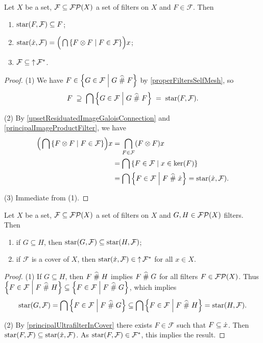 \begin{lemma} \label{starRefinementLemma}
Let $X$ be a set, $\mathcal{F} \subseteq \operatorname{\mathcal{FP}}(X)$ a set of filters on $X$ and $F\in \mathcal{F}$. Then
\begin{enumerate}
\item $\operatorname{star}(F,\mathcal{F}) \subseteq F$;
\item $\starFilter(\pfilter{x}, \mathcal{F}) = \Big(\bigcap\setbuilder{F\otimes F}{F\in\mathcal{F}}\Big)x$;
\item $\mathcal{F} \subseteq \operatorname{\uparrow}\mathcal{F}^*$.
\end{enumerate}
\end{lemma}
\begin{proof}
(1) We have $F\in \setbuilder{G\in \mathcal{F}}{G \amesh F}$ by \ref{properFiltersSelfMesh}, so
\[ F \;\supseteq\; \bigcap \setbuilder{G\in \mathcal{F}}{G \amesh F} \;=\; \starFilter(F,\mathcal{F}). \]

(2) By \ref{upsetResiduatedImageGaloisConnection} and \ref{principalImageProductFilter}, we have
\begin{align*}
\Big(\bigcap\setbuilder{F\otimes F}{F\in\mathcal{F}}\Big)x &= \bigcap_{F\in\mathcal{F}}(F\otimes F)x \\
&= \bigcap \setbuilder{F\in\mathcal{F}}{x\in\ker(F)} \\
&= \bigcap \setbuilder{F\in\mathcal{F}}{F\amesh\pfilter{x}} = \starFilter(\pfilter{x}, \mathcal{F}).
\end{align*}

(3) Immediate from (1).
\end{proof}

\begin{lemma} \label{starFilterOrderingLemma}
Let $X$ be a set, $\mathcal{F} \subseteq \operatorname{\mathcal{FP}}(X)$ a set of filters on $X$ and $G,H\in \operatorname{\mathcal{FP}}(X)$ filters. Then
\begin{enumerate}
\item if $G\subseteq H$, then $\operatorname{star}(G,\mathcal{F}) \subseteq \operatorname{star}(H,\mathcal{F})$;
\item if $\mathcal{F}$ is a cover of $X$, then $\operatorname{star}(\dot{x}, \mathcal{F}) \in \operatorname{\uparrow} \mathcal{F}^*$ for all $x\in X$.
\end{enumerate}
\end{lemma}
\begin{proof}
(1) If $G\subseteq H$, then $F\mathrel{\widehat{\#}} H$ implies $F\mathrel{\widehat{\#}} G$ for all filters $F\in\operatorname{\mathcal{FP}}(X)$. Thus $\setbuilder{F\in\mathcal{F}}{F\amesh H} \subseteq \setbuilder{F\in\mathcal{F}}{F\amesh G}$, which implies
\[ \starFilter(G,\mathcal{F}) = \bigcap\setbuilder{F\in\mathcal{F}}{F\amesh G} \subseteq \bigcap\setbuilder{F\in\mathcal{F}}{F\amesh H} = \starFilter(H,\mathcal{F}). \]

(2) By \ref{principalUltrafilterInCover} there exists $F\in \mathcal{F}$ such that $F\subseteq \dot{x}$. Then $\operatorname{star}(F, \mathcal{F}) \subseteq \operatorname{star}(\dot{x}, \mathcal{F})$. As $\operatorname{star}(F, \mathcal{F}) \in \mathcal{F}^*$, this implies the result.
\end{proof}

